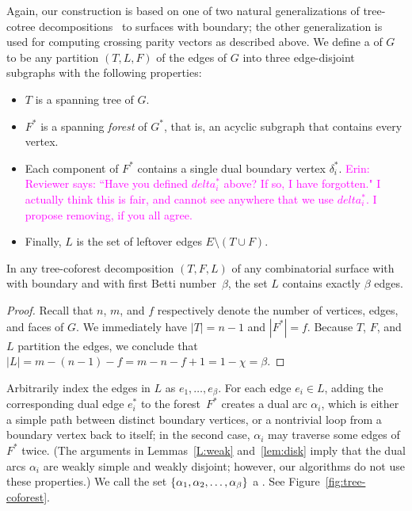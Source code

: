 \documentclass[letterpaper,review]{siamart190516}
\def\dualarc{\alpha}
\def\enote#1{\textcolor{magenta}{Erin: #1}}
\begin{document}
Again, our construction is based on one of two natural generalizations of tree-cotree
decompositions~\cite{e-dgteg-03} to surfaces with boundary; the other generalization is used for
computing crossing parity vectors as described above.
We define a  of $G$ to be any partition $(T, L, F)$ of the edges of $G$ into three edge-disjoint subgraphs with the following properties:
\begin{itemize}\itemsep0pt
\item $T$ is a spanning tree of $G$.
\item $F^*$ is a spanning \emph{forest} of $G^*$, that is, an acyclic subgraph that contains every vertex.
\item Each component of $F^*$ contains a single dual boundary vertex $\delta_i^*$. \enote{Reviewer says: ``Have you defined $delta_i^*$ above? If so, I have forgotten."  I actually think this is fair, and cannot see anywhere that we use $delta_i^*$.  I propose removing, if you all agree.}
\item Finally, $L$ is the set of leftover edges $E \setminus (T\cup F)$.
\end{itemize}
%
\begin{lemma}
\label{lem:L_edges_tree_coforest}
In any tree-coforest decomposition $(T, F, L)$ of any combinatorial surface with with boundary and with first Betti number~$\beta$, the set $L$ contains exactly $\beta$ edges.
\end{lemma}

\begin{proof}
Recall that $n$, $m$, and $f$ respectively denote the number of vertices, edges, and faces of $G$.
We immediately have $|T| = n-1$ and $|F^*| = f$.  Because $T$, $F$, and $L$ partition the edges, we conclude that $|L| = m - (n-1) - f = m - n - f + 1 = 1 - \chi  = \beta$.
\end{proof}

Arbitrarily index the edges in $L$ as $e_1, \dots, e_\beta$.  For each edge $e_i\in L$, adding the corresponding dual edge $e_i^*$ to the forest~$F^*$ creates a dual arc $\dualarc_i$, which is either a simple path between distinct boundary vertices, or a nontrivial loop from a boundary vertex back to itself; in the second case, $\dualarc_i$ may traverse some edges of $F^*$ twice.  (The arguments in Lemmas~\ref{L:weak} and~\ref{lem:disk} imply that the dual arcs $\dualarc_i$ are weakly simple and weakly disjoint; however, our algorithms do not use these properties.)
We call the set $\set{\dualarc_1, \dualarc_2, \dots, \dualarc_\beta}$ a .  See Figure~\ref{fig:tree-coforest}.  
\end{document}
